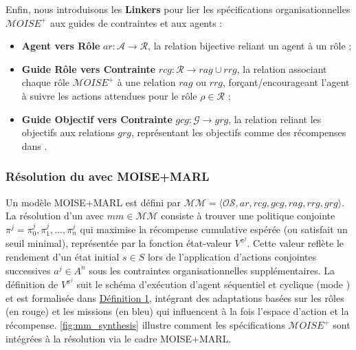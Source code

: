 \noindent Enfin, nous introduisons les \textbf{Linkers} pour lier les spécifications organisationnelles $\mathcal{M}OISE^+$ aux guides de contraintes et aux agents :
%
\begin{itemize}

    \item \textbf{Agent vers Rôle} \quad $ar: \mathcal{A} \to \mathcal{R}$, la relation bijective reliant un agent à un rôle ;
    \item \textbf{Guide Rôle vers Contrainte} \quad $rcg: \mathcal{R} \rightarrow rag \cup rrg$, la relation associant chaque rôle $\mathcal{M}OISE^+$ à une relation $rag$ ou $rrg$, forçant/encourageant l'agent à suivre les actions attendues pour le rôle $\rho \in \mathcal{R}$ ;
    \item \textbf{Guide Objectif vers Contrainte} \quad $gcg: \mathcal{G} \rightarrow grg$, la relation reliant les objectifs aux relations $grg$, représentant les objectifs comme des récompenses dans .
\end{itemize}

\subsubsection*{Résolution du  avec MOISE+MARL}

Un modèle MOISE+MARL est défini par $\mathcal{MM} = \langle \mathcal{OS}, ar, rcg, gcg, rag, rrg, grg \rangle$.
La résolution d'un  avec $mm \in \mathcal{MM}$ consiste à trouver une politique conjointe $\pi^j = {\pi^j_0, \pi^j_1, \dots, \pi^j_n}$ qui maximise la récompense cumulative espérée (ou satisfait un seuil minimal), représentée par la fonction état-valeur $V^{\pi^j}$. Cette valeur reflète le rendement d'un état initial $s \in S$ lors de l'application d'actions conjointes successives $a^j \in A^n$ sous les contraintes organisationnelles supplémentaires.
%
La définition de $V^{\pi^j}$ suit le schéma d'exécution d'agent séquentiel et cyclique (mode ) et est formalisée dans \hyperref[eq:single_value_function]{Définition 1}, intégrant des adaptations basées sur les rôles (en rouge) et les missions (en bleu) qui influencent à la fois l'espace d'action et la récompense.
\autoref{fig:mm_synthesis} illustre comment les spécifications $\mathcal{M}OISE^+$ sont intégrées à la résolution  via le cadre MOISE+MARL.


